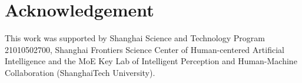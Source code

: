 \documentclass{bmvc2k}
\begin{document}
\section*{Acknowledgement}
This work was supported by Shanghai Science and Technology Program 21010502700, Shanghai Frontiers Science Center of Human-centered Artificial Intelligence and the MoE Key Lab of Intelligent Perception and Human-Machine Collaboration (ShanghaiTech University). 


\end{document}
